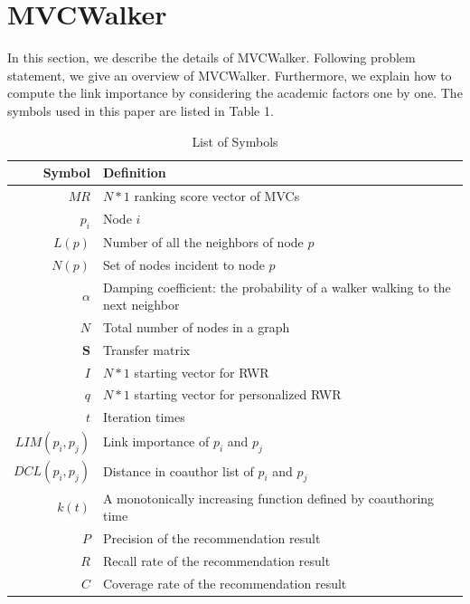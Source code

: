 \documentclass[10pt,journal,compsoc]{IEEEtran}
\begin{document}
\section{MVCWalker}
In this section, we describe the details of MVCWalker. Following problem statement, we give an overview of MVCWalker. Furthermore, we explain how to compute the link importance by considering the academic factors one by one. The symbols used in this paper are listed in Table 1.
\begin{table}
\renewcommand{\arraystretch}{1.2}
\caption{List of Symbols}
\label{tab:1}
\begin{tabular*}{3.5in}{@{\extracolsep{\fill}}r| l}
\hline
Symbol & Definition  \\
\hline
$MR$	           & \multirow{1}{2.8in}{$N\ast1$ ranking score vector of MVCs}	                             \\
$p_{i}$            & \multirow{1}{2.8in}{Node $i$} 	                      \\
$L(p)$	           & \multirow{1}{2.8in}{Number of all the neighbors of node $p$}                           \\
$N(p)$	           & \multirow{1}{2.8in}{Set of nodes incident to node $p$}             \\
\multirow{2}{*}{$\alpha$}	  & \multirow{2}{2.8in}{Damping coefficient: the probability of a walker walking to the next neighbor}                        \\
~~	   & ~~                       \\
$N$	   & \multirow{1}{2.8in}{Total number of nodes in a graph}    \\
$\mathbf{S}$	   & \multirow{1}{2.8in}{Transfer matrix}   \\
$I$	   & \multirow{1}{2.8in}{$N\ast1$ starting vector for RWR}                                     \\
$q$	   & \multirow{1}{2.8in}{$N\ast1$ starting vector for personalized RWR}	                                     \\
$t$  & \multirow{1}{2.8in}{Iteration times}  \\
$LIM(p_{i}, p_{j})$  & \multirow{1}{2.8in}{Link importance of $p_{i}$ and $p_{j}$}               \\
$DCL(p_{i}, p_{j})$  & \multirow{1}{2.8in}{Distance in coauthor list of $p_{i}$ and $p_{j}$ }	                 \\
\multirow{2}{*}{$k(t)$}	   & \multirow{2}{2.8in}{A monotonically increasing function defined by coauthoring time}                \\
~~	   & ~~                       \\
$P$	   & \multirow{1}{2.8in}{Precision of the recommendation result}                      \\
$R$	   & \multirow{1}{2.8in}{Recall rate of the recommendation result}	                                                 \\
$C$    & \multirow{1}{2.8in}{Coverage rate of the recommendation result}	                                             \\
\hline
\end{tabular*}
\end{table}
\end{document}
